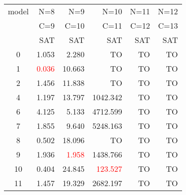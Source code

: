  \begin{tabular}[c] {|c||r|r|r|r|r|}\hline
   model & N=8                    & N=9                    & N=10                     & N=11 & N=12 \\
         & C=9                    & C=10                   & C=11                     & C=12 & C=13 \\
         & SAT                    & SAT                    & SAT                      & SAT  & SAT  \\\hline
   0     & 1.053                  & 2.280                  & TO                       & TO   & TO \\
   1     & \textcolor{red}{0.036} & 10.663                 & TO                       & TO   & TO \\
   2     & 1.456                  & 11.838                 & TO                       & TO   & TO \\
   4     & 1.197                  & 13.797                 & 1042.342                 & TO   & TO \\
   6     & 4.125                  & 5.133                  & 4712.599                 & TO   & TO \\
   7     & 1.855                  & 9.640                  & 5248.163                 & TO   & TO \\
   8     & 0.502                  & 18.096                 & TO                       & TO   & TO \\
   9     & 1.936                  & \textcolor{red}{1.958} & 1438.766                 & TO   & TO \\
   10    & 0.404                  & 24.845                 & \textcolor{red}{123.527} & TO   & TO \\
   11    & 1.457                  & 19.329                 & 2682.197                 & TO   & TO \\\hline 
  \end{tabular}
